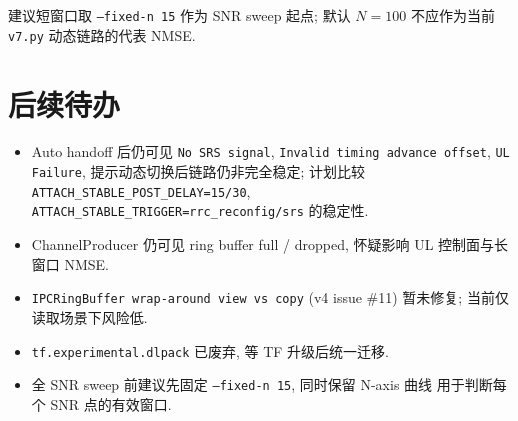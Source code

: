 \documentclass[11pt,a4paper,UTF8,fontset=fandol]{ctexart}
\newcommand{\vseven}{\texttt{v7.py}}
\begin{document}
建议短窗口取 \texttt{--fixed-n 15} 作为 SNR sweep 起点; 默认 $N=100$
不应作为当前 \vseven{} 动态链路的代表 NMSE.

\section{后续待办}
\label{sec:todo}

\begin{itemize}
  \item Auto handoff 后仍可见 \texttt{No SRS signal},
        \texttt{Invalid timing advance offset}, \texttt{UL Failure},
        提示动态切换后链路仍非完全稳定; 计划比较
        \texttt{ATTACH\_STABLE\_POST\_DELAY=15/30},
        \texttt{ATTACH\_STABLE\_TRIGGER=rrc\_reconfig/srs} 的稳定性.
  \item ChannelProducer 仍可见 ring buffer full / dropped, 怀疑影响
        UL 控制面与长窗口 NMSE.
  \item \texttt{IPCRingBuffer wrap-around view vs copy} (v4 issue \#11) 暂未修复;
        当前仅读取场景下风险低.
  \item \texttt{tf.experimental.dlpack} 已废弃, 等 TF 升级后统一迁移.
  \item 全 SNR sweep 前建议先固定 \texttt{--fixed-n 15}, 同时保留 N-axis 曲线
        用于判断每个 SNR 点的有效窗口.
\end{itemize}
\end{document}
